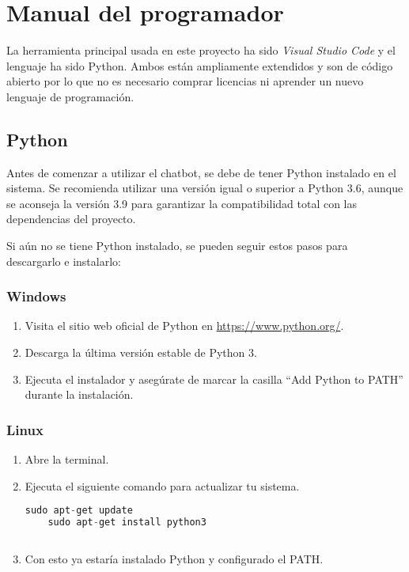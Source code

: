 \section{Manual del programador}\label{ManualProgramador}

La herramienta principal usada en este proyecto ha sido \textit{Visual Studio Code} y el lenguaje ha sido Python. Ambos están ampliamente extendidos y son de código abierto por lo que no es necesario comprar licencias ni aprender un nuevo lenguaje de programación. 

\subsection{Python} 

Antes de comenzar a utilizar el chatbot, se debe de tener Python instalado en el sistema. Se recomienda utilizar una versión igual o superior a Python 3.6, aunque se aconseja la versión 3.9 para garantizar la compatibilidad total con las dependencias del proyecto.

Si aún no se tiene Python instalado, se pueden seguir estos pasos para descargarlo e instalarlo:

\subsubsection{Windows}

\begin{enumerate}
     \item Visita el sitio web oficial de Python en \url{https://www.python.org/}.
     
     \item Descarga la última versión estable de Python 3.
     
     \item Ejecuta el instalador y asegúrate de marcar la casilla ``Add Python to PATH'' durante la instalación.
\end{enumerate}

\subsubsection{Linux}

\begin{enumerate}
     \item Abre la terminal.
     
     \item Ejecuta el siguiente comando para actualizar tu sistema.
\begin{lstlisting}[language=Python, caption=Instalaciónde Python en Linux.]
    sudo apt-get update
    sudo apt-get install python3
    
\end{lstlisting}
     
     \item Con esto ya estaría instalado Python y configurado el PATH.
\end{enumerate}

